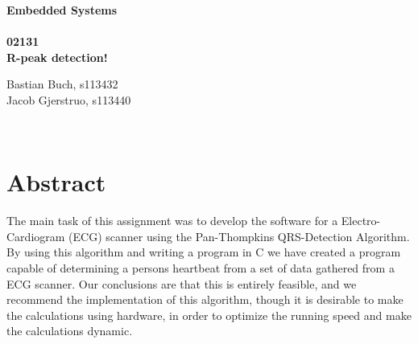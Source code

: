 \documentclass[12pt,a4paper]{article}
\begin{document}
\begin{titlepage}
	\begin{center}
		\vspace*{13\baselineskip}
		\huge
		\bfseries
		Embedded Systems\\ 
		\ \\
		02131 \\[5\baselineskip]

		\normalfont
		\Large
		R-peak detection!\\	

		\small
		\vfill
	\end{center}	
	\begin{flushleft}
		Bastian Buch, s113432\\
	 	Jacob Gjerstruo, s113440\\
	\end{flushleft}
\end{titlepage}

\ \\
\section*{Abstract}
The main task of this assignment was to develop the software for a Electro-Cardiogram (ECG) scanner using the Pan-Thompkins QRS-Detection Algorithm. By using this algorithm and writing a program in C we have created a program capable of determining a persons heartbeat from a set of data gathered from a ECG scanner. Our conclusions are that this is entirely feasible, and we recommend the implementation of this algorithm, though it is desirable to make the calculations using hardware, in order to optimize the running speed and make the calculations dynamic.
\thispagestyle{empty} 
\newpage

\tableofcontents
\thispagestyle{empty} 
\newpage

\setcounter{page}{1}

\ \\
\end{document}
